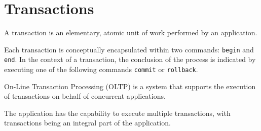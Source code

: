 \section{Transactions}

\begin{definition}
    A transaction is an elementary, atomic unit of work performed by an application. 
\end{definition}
Each transaction is conceptually encapsulated within two commands: \texttt{begin} and \texttt{end}. 
In the context of a transaction, the conclusion of the process is indicated by executing one of the following commands \texttt{commit} or \texttt{rollback}.
\begin{definition}
    On-Line Transaction Processing (OLTP) is a system that supports the execution of transactions on behalf of concurrent applications. 
\end{definition}
The application has the capability to execute multiple transactions, with transactions being an integral part of the application. 

